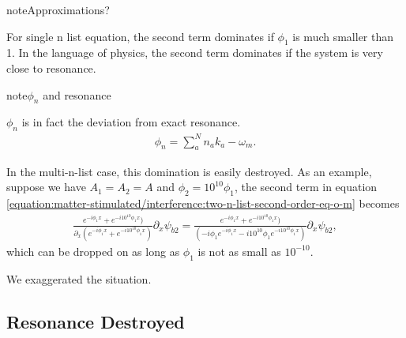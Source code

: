 \documentclass[letterpaper,12pt,english]{sphinxmanual}
\begin{document}
\begin{sphinxadmonition}{note}{Approximations?}

For single n list equation, the second term dominates if \(\phi_1\) is much smaller than 1. In the language of physics, the second term dominates if the system is very close to resonance.

\begin{sphinxadmonition}{note}{\(\phi_n\) and resonance}

\(\phi_n\) is in fact the deviation from exact resonance.
\begin{equation*}
\begin{split}\phi_n = \sum_{a}^N n_a k_a - \omega_m.\end{split}
\end{equation*}\end{sphinxadmonition}

In the multi-n-list case, this domination is easily destroyed. As an example, suppose we have \(A_1= A_2 = A\) and \(\phi_2 = 10^{10}\phi_1\), the second term in equation \eqref{equation:matter-stimulated/interference:two-n-list-second-order-eq-o-m} becomes
\begin{equation*}
\begin{split}\frac{ e^{ - i \phi_1 x } + e^{ -i 10^{10}\phi_1 x }) }{\partial_x (e^{ - i \phi_1 x } + e^{ -i 10^{10}\phi_1 x }) } \partial_x \psi_{b2} = \frac{ e^{ - i \phi_1 x } + e^{ -i 10^{10}\phi_1 x }) }{ (-i\phi_1 e^{ - i \phi_1 x } - i 10^{10}\phi_1 e^{ -i 10^{10}\phi_1 x }) } \partial_x \psi_{b2},\end{split}
\end{equation*}
which can be dropped on as long as \(\phi_1\) is not as small as \(10^{-10}\).

We exaggerated the situation.
\end{sphinxadmonition}


\subsection{Resonance Destroyed}
\label{\detokenize{matter-stimulated/interference:resonance-destroyed}}
\end{document}
